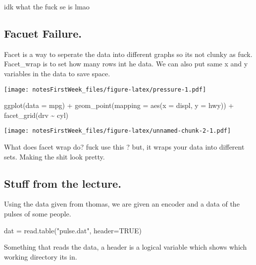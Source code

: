 \documentclass[
]{article}
\newenvironment{Shaded}{\begin{snugshade}}{\end{snugshade}}
\newcommand{\AttributeTok}[1]{\textcolor[rgb]{0.77,0.63,0.00}{#1}}
\newcommand{\ConstantTok}[1]{\textcolor[rgb]{0.00,0.00,0.00}{#1}}
\newcommand{\FunctionTok}[1]{\textcolor[rgb]{0.00,0.00,0.00}{#1}}
\newcommand{\NormalTok}[1]{#1}
\newcommand{\OtherTok}[1]{\textcolor[rgb]{0.56,0.35,0.01}{#1}}
\newcommand{\SpecialCharTok}[1]{\textcolor[rgb]{0.00,0.00,0.00}{#1}}
\newcommand{\StringTok}[1]{\textcolor[rgb]{0.31,0.60,0.02}{#1}}
\begin{document}
idk what the fuck se is lmao

\hypertarget{facuet-failure.}{%
\subsection{Facuet Failure.}\label{facuet-failure.}}

Facet is a way to seperate the data into different graphs so its not
clunky as fuck. Facet\_wrap is to set how many rows int he data. We can
also put same x and y variables in the data to save space.

\texttt{[image: notesFirstWeek\_files/figure-latex/pressure-1.pdf]}

\begin{Shaded}
\begin{Highlighting}[]
\FunctionTok{ggplot}\NormalTok{(}\AttributeTok{data =}\NormalTok{ mpg) }\SpecialCharTok{+} 
  \FunctionTok{geom\_point}\NormalTok{(}\AttributeTok{mapping =} \FunctionTok{aes}\NormalTok{(}\AttributeTok{x =}\NormalTok{ displ, }\AttributeTok{y =}\NormalTok{ hwy)) }\SpecialCharTok{+} 
  \FunctionTok{facet\_grid}\NormalTok{(drv }\SpecialCharTok{\textasciitilde{}}\NormalTok{ cyl)}
\end{Highlighting}
\end{Shaded}

\texttt{[image: notesFirstWeek\_files/figure-latex/unnamed-chunk-2-1.pdf]}

What does facet wrap do? fuck use this ? but, it wraps your data into
different sets. Making the shit look pretty.

\hypertarget{stuff-from-the-lecture.}{%
\subsection{Stuff from the lecture.}\label{stuff-from-the-lecture.}}

Using the data given from thomas, we are given an encoder and a data of
the pulses of some people.

\begin{Shaded}
\begin{Highlighting}[]
\NormalTok{dat }\OtherTok{=} \FunctionTok{read.table}\NormalTok{(}\StringTok{"pulse.dat"}\NormalTok{, }\AttributeTok{header=}\ConstantTok{TRUE}\NormalTok{)}
\end{Highlighting}
\end{Shaded}

Something that reads the data, a header is a logical variable which
shows which working directory its in.
\end{document}

